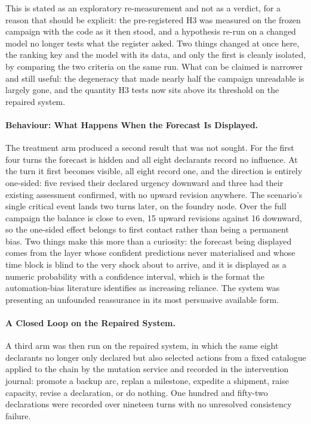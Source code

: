 This is stated as an exploratory re-measurement and not as a verdict, for a reason that should be explicit: the pre-registered H3 was measured on the frozen campaign with the code as it then stood, and a hypothesis re-run on a changed model no longer tests what the register asked. Two things changed at once here, the ranking key and the model with its data, and only the first is cleanly isolated, by comparing the two criteria on the same run. What can be claimed is narrower and still useful: the degeneracy that made nearly half the campaign unreadable is largely gone, and the quantity H3 tests now sits above its threshold on the repaired system.


\paragraph{Behaviour: What Happens When the Forecast Is Displayed.}
The treatment arm produced a second result that was not sought. For the first four turns the forecast is hidden and all eight declarants record no influence. At the turn it first becomes visible, all eight record one, and the direction is entirely one-sided: five revised their declared urgency downward and three had their existing assessment confirmed, with no upward revision anywhere. The scenario's single critical event lands two turns later, on the foundry node. Over the full campaign the balance is close to even, 15 upward revisions against 16 downward, so the one-sided effect belongs to first contact rather than being a permanent bias. Two things make this more than a curiosity: the forecast being displayed comes from the layer whose confident predictions never materialised and whose time block is blind to the very shock about to arrive, and it is displayed as a numeric probability with a confidence interval, which is the format the automation-bias literature identifies as increasing reliance. The system was presenting an unfounded reassurance in its most persuasive available form.

\paragraph{A Closed Loop on the Repaired System.}
A third arm was then run on the repaired system, in which the same eight declarants no longer only declared but also selected actions from a fixed catalogue applied to the chain by the mutation service and recorded in the intervention journal: promote a backup arc, replan a milestone, expedite a shipment, raise capacity, revise a declaration, or do nothing. One hundred and fifty-two declarations were recorded over nineteen turns with no unresolved consistency failure.

